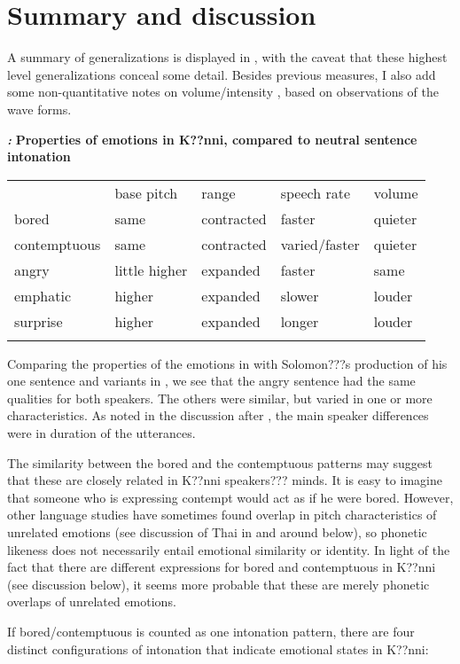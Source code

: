 \documentclass[output=paper]{langsci/langscibook}
\begin{document}
\section{Summary and discussion}

A summary of generalizations is displayed in , with the caveat that these highest level generalizations conceal some detail. Besides previous measures, I also add some non-quantitative notes on volume/intensity , based on observations of the wave forms. 

\emph{\textbf{\textup{:}}}\textbf{ Properties of emotions in K??nni, compared to neutral sentence intonation }

\begin{tabularx}{\textwidth}{XXXXX} & base pitch & range & speech rate & volume\\
\lsptoprule
bored & same & contracted & faster & quieter\\
contemptuous & same & contracted & varied/faster & quieter\\
angry & little higher & expanded & faster & same\\
emphatic & higher & expanded & slower & louder\\
surprise & higher & expanded & longer & louder\\
\lspbottomrule
\end{tabularx}
Comparing the properties of the emotions in  with Solomon???s production of his one sentence and variants in , we see that the angry sentence had the same qualities for both speakers. The others were similar, but varied in one or more characteristics. As noted in the discussion after , the main speaker differences were in duration of the utterances.

The similarity between the bored and the contemptuous patterns may suggest that these are closely related in K??nni speakers??? minds. It is easy to imagine that someone who is expressing contempt would act as if he were bored. However, other language studies have sometimes found overlap in pitch characteristics of unrelated emotions (see discussion of Thai in and around  below), so phonetic likeness does not necessarily entail emotional similarity or identity. In light of the fact that there are different expressions for bored and contemptuous in K??nni (see discussion below), it seems more probable that these are merely phonetic overlaps of unrelated emotions.

If bored/contemptuous is counted as one intonation pattern, there are four distinct configurations of intonation that indicate emotional states in K??nni:
\end{document}
